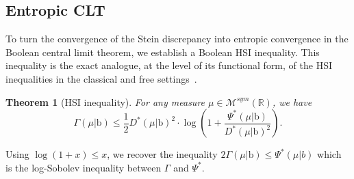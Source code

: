 \documentclass[10pt, reqno]{amsart}
\numberwithin{equation}{section}
\theoremstyle{definition}
\theoremstyle{plain}
\newtheorem{theorem}[definition]{Theorem}
\theoremstyle{remark}
\newcommand{\1}{\mathbbm{1}}
\begin{document}
\subsection{Entropic CLT}\label{sec:EntropicCLT} To turn the convergence of the Stein discrepancy into entropic convergence in the Boolean central limit theorem, we establish a Boolean HSI inequality. 
This inequality is the exact analogue, at the level of its functional form, of the HSI inequalities in the classical and free settings~\cite{ledoux2015stein,fathi2017free}.
\begin{theorem}[HSI inequality]\label{thm:HSI}For any measure $\mu\in \mathcal{M}^{sym}(\mathbb{R})$, we have
$$\Gamma(\mu|\mathbb{\mathrm{b}})\leq \frac{1}{2}D^*(\mu|\mathbb{\mathrm{b}})^2\cdot \log\left(1+\frac{\Psi^*(\mu|\mathbb{\mathrm{b}})}{D^*(\mu|\mathbb{\mathrm{b}})^2}\right).$$
\end{theorem}
Using $\log(1+x)\leq x$, we recover the inequality $2\Gamma(\mu|\mathbb{\mathrm{b}})\leq \Psi^*(\mu|b)$ which is the log-Sobolev inequality between $\Gamma$ and $\Psi^*$. 
\end{document}
